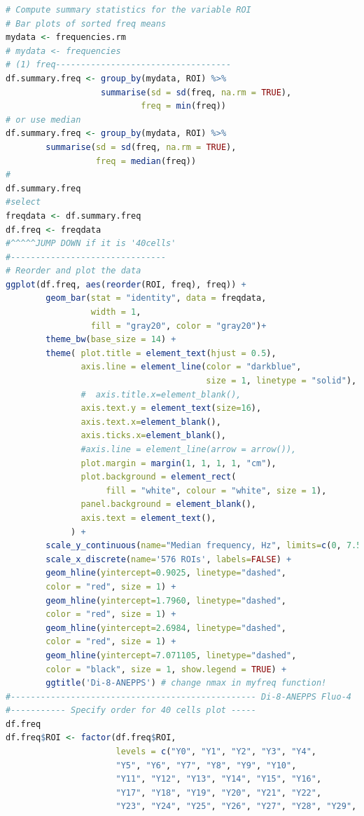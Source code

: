 \documentclass{biophys-new}
\begin{document}
\begin{lstlisting}[language=R]
# Compute summary statistics for the variable ROI
# Bar plots of sorted freq means
mydata <- frequencies.rm
# mydata <- frequencies
# (1) freq-----------------------------------
df.summary.freq <- group_by(mydata, ROI) %>%
                   summarise(sd = sd(freq, na.rm = TRUE),
                           freq = min(freq))
# or use median
df.summary.freq <- group_by(mydata, ROI) %>%
        summarise(sd = sd(freq, na.rm = TRUE),
                  freq = median(freq))
#
df.summary.freq
#select
freqdata <- df.summary.freq
df.freq <- freqdata
#^^^^^JUMP DOWN if it is '40cells'
#-------------------------------
# Reorder and plot the data
ggplot(df.freq, aes(reorder(ROI, freq), freq)) +
        geom_bar(stat = "identity", data = freqdata,
                 width = 1,
                 fill = "gray20", color = "gray20")+
        theme_bw(base_size = 14) +
        theme( plot.title = element_text(hjust = 0.5),
               axis.line = element_line(color = "darkblue",
                                        size = 1, linetype = "solid"),
               #  axis.title.x=element_blank(),
               axis.text.y = element_text(size=16),
               axis.text.x=element_blank(),
               axis.ticks.x=element_blank(),
               #axis.line = element_line(arrow = arrow()),
               plot.margin = margin(1, 1, 1, 1, "cm"),
               plot.background = element_rect(
                    fill = "white", colour = "white", size = 1),
               panel.background = element_blank(),
               axis.text = element_text(),
             ) +
        scale_y_continuous(name="Median frequency, Hz", limits=c(0, 7.5)) +
        scale_x_discrete(name='576 ROIs', labels=FALSE) +
        geom_hline(yintercept=0.9025, linetype="dashed",
        color = "red", size = 1) +
        geom_hline(yintercept=1.7960, linetype="dashed",
        color = "red", size = 1) +
        geom_hline(yintercept=2.6984, linetype="dashed",
        color = "red", size = 1) +
        geom_hline(yintercept=7.071105, linetype="dashed",
        color = "black", size = 1, show.legend = TRUE) +
        ggtitle('Di-8-ANEPPS') # change nmax in myfreq function!
#------------------------------------------------- Di-8-ANEPPS Fluo-4
#----------- Specify order for 40 cells plot -----
df.freq
df.freq$ROI <- factor(df.freq$ROI,
                      levels = c("Y0", "Y1", "Y2", "Y3", "Y4",
                      "Y5", "Y6", "Y7", "Y8", "Y9", "Y10",
                      "Y11", "Y12", "Y13", "Y14", "Y15", "Y16",
                      "Y17", "Y18", "Y19", "Y20", "Y21", "Y22",
                      "Y23", "Y24", "Y25", "Y26", "Y27", "Y28", "Y29",

\end{lstlisting}
\end{document}
